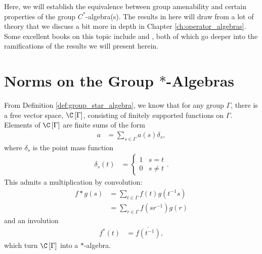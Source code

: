Here, we will establish the equivalence between group amenability and certain properties of the group $C^{\ast}$-algebra(s). The results in here will draw from a lot of theory that we discuss a bit more in depth in Chapter \ref{ch:operator_algebras}. Some excellent books on this topic include \cite{brown_and_ozawa} and \cite{completely_bounded_maps_and_operator_algebras}, both of which go deeper into the ramifications of the results we will present herein.
\section{Norms on the Group \texorpdfstring{$\ast$-Algebras}{*-Algebras}}%
From Definition \ref{def:group_star_algebra}, we know that for any group $\Gamma$, there is a free vector space, $\C\left[ \Gamma \right]$, consisting of finitely supported functions on $\Gamma$. Elements of $\C\left[ \Gamma \right]$ are finite sums of the form
\begin{align*}
  a &= \sum_{s\in\Gamma}a(s)\delta_s,
\end{align*}
where $\delta_s$ is the point mass function
\begin{align*}
  \delta_s\left( t \right) &= \begin{cases}
    1 & s = t\\
    0 & s\neq t
  \end{cases}.
\end{align*}
This admits a multiplication by convolution:
\begin{align*}
  f\ast g(s) &= \sum_{t\in\Gamma}f(t)g\left( t^{-1}s \right)\\
              &= \sum_{r\in\Gamma}f\left( sr^{-1} \right)g\left( r \right)
\end{align*}
and an involution
\begin{align*}
  f^{\ast}\left( t \right) &= \overline{f\left( t^{-1} \right)},
\end{align*}
which turn $\C\left[ \Gamma \right]$ into a $\ast$-algebra.\newline

